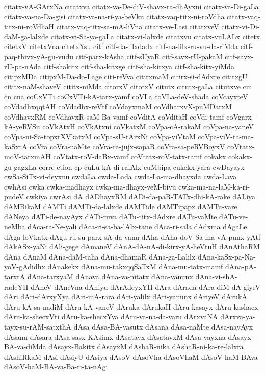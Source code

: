 {citatx-vA-GArxNa
citatxva
citatx-va-De-diV-shavx-ra-dhAyxni
citatx-va-Di-gaLa
citatx-va-na-Da-gisi
citatx-va-na-ri-ya-beVku
citatx-vaq-titx-ni-roVdha
citatx-vaq-titx-ni-roVdhaH
citatx-vaq-titx-sa-mA-liVna
citatx-ve-Lasi
citatxveV
citatx-vi-Di-daM-ga-lalxde
citatx-vi-Sa-ya-gaLa
citatx-vi-lalxde
citatxvu
citatx-vuLALx
citetx
citetxV
citetxVna
citetxYsu
citf
citf-da-lilxdadx
citf-na-lilx-ru-vu-da-riMda
citf-paq-thivx-yA-gu-vudu
citf-parx-kAsha
citf-sUyaR
citf-savx-rU-pakaM
citf-savx-rU-pa-nAda
citf-shakitx
citf-sha-kitxge
citf-sha-kitxya
citf-sha-kitx-yiMda
citipxMDa
citipxM-Da-do-Lage
citi-reVva
citirxmaM
citirx-si-dAdxre
cititxgU
cititx-naM-shaveV
cititx-niMda
citorxV
citotxV
citutx
citutx-gaLa
citutxve
cm
cn
cna
coCxVTi
coCxVTi-kA-tarx-yamf
coVLa
coVLa-deV-shada
coVcayxteV
coVdadhxqqtAH
coVdadhx-reVtf
coVdayxmaM
coVdharxvX-puMDarxM
coVdhavxRM
coVdhavxR-saM-Ba-vamf
coVditA
coVditaH
coVdi-tamf
coVgarx-kA-yeRVSu
coVkAtxH
coVkAtxni
coVkatxM
coVpa-cA-rakaM
coVpa-na-yaneV
coVpa-ni-Sa-topxrXVkatxM
coVpa-sU-tArxNi
coVpa-viVtaM
coVpa-viV-ta-ma-kaSxtA
coVra
coVra-naMte
coVra-ra-jujx-sapaR
coVra-sa-peRVBoyxV
coVtatx-moV-tatxmAH
coVtatx-roV-daBx-vamf
coVtatx-roV-tatx-ramf
cokakx
cokakx-gu-gagxLa
corre-ction
cp
cuLu-kA-di-ralAlx
cuMbipa
cukekx-yara
cwDayayx
cwSa-SiTx-vi-deyxnu
cwdaLa
cwda-Lada
cwda-La-ma-dhayxda
cwda-Lava
cwhAsi
cwka
cwka-madhayx
cwka-ma-dhayx-veM-bivu
cwka-ma-na-laM-ka-ri-pudeV
cwkiya
cwrAsi
dA
dADhayxRM
dADi-da-paR-TATx-dhi-kA-rake
dALiya
dAMBikaM
dAMTi
dAMTi-da-lalxde
dAMTide
dAMTipapx
dAMTu-vare
dANeya
dATi-de-nayAyx
dATi-ruva
dATu-titx-dAdxre
dATu-vaMte
dATu-ve-neMba
dAca-ra-Ne-yali
dAca-ri-sa-ba-lAlx-tane
dAca-ri-sala
dAdxma
dAgaLe
dAga-loVkatx
dAgu-ru-su-parx-sA-da-vanu
dAha
dAha-doV-Sa-ma-vA-punx-yAtf
dAkASx-yaNi
dAli-gege
dAmaneV
dAnA-dA-nA-di-kirx-yA-heVtuH
dAnAthaRM
dAna
dAnaM
dAna-daM-taha
dAna-dhamaR
dAna-ga-Lalilx
dAna-kaSx-pa-Na-yoV-gAdidhx
dAnakekx
dAna-mu-takxqqSaTxM
dAna-mu-tatx-mamf
dAna-pA-tarxtA
dAna-tarxyaM
dAnava
dAna-va-nitatx
dAna-vanunx
dAna-vi-shA-radeYH
dAneV
dAneVna
dAniyu
dArAdeyxYH
dAra
dArada
dAra-diM-dA-giyeV
dAri
dAri-dArxyXya
dAri-mA-rara
dAri-yalilx
dAri-yanunx
dAriyeV
dArukA
dAru-kA-sa-nadiM
dAru-kA-vaneV
dAruka
dArukaH
dAru-kasayx
dAru-kashacx
dAru-ka-shecxVti
dAru-ka-shecxYva
dAru-va-na-da-varu
dArxvaNA
dArxva-ya-tayx-su-rAM-satxthA
dAsa
dAsa-BA-vasutx
dAsana
dAsa-naMte
dAsa-nayAyx
dAsanu
dAsara
dAsa-sasx-KAsimx
dAsatavx
dAsatavxM
dAsa-yayxna
dAsayx-BA-va-diMda
dAsayx-Bakitx
dAsayxM
dAshaR-nika
dAshaR-ni-ka-re-lalxra
dAshiRkaM
dAsi
dAsiyU
dAsiya
dAsoV
dAsoVha
dAsoVhaM
dAsoV-haM-BAva
dAsoV-haM-BA-va-Ba-ri-ta-nAgi
}
